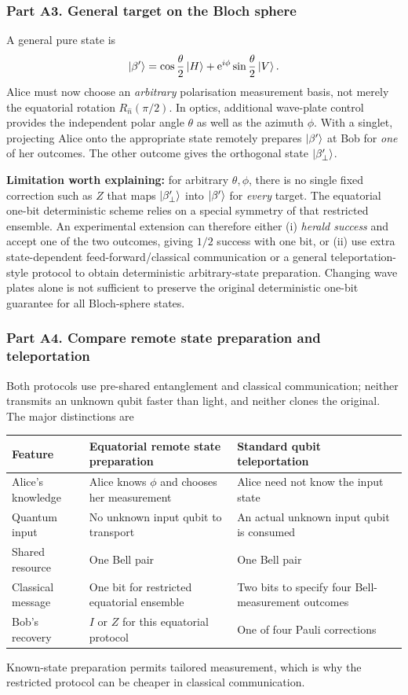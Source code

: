 \subsubsection*{Part A3. General target on the Bloch sphere}
A general pure state is
\begin{equation}\left\lvert \beta'\right\rangle=\cos\frac\theta2\left\lvert H\right\rangle+\mathrm{e}^{i\phi}\sin\frac\theta2\left\lvert V\right\rangle.\end{equation}
Alice must now choose an \emph{arbitrary} polarisation measurement basis, not merely the equatorial rotation $R_{\hat n}(\pi/2)$. In optics, additional wave-plate control provides the independent polar angle $\theta$ as well as the azimuth $\phi$. With a singlet, projecting Alice onto the appropriate state remotely prepares $\left\lvert \beta'\right\rangle$ at Bob for \emph{one} of her outcomes. The other outcome gives the orthogonal state $\left\lvert \beta'_{\perp}\right\rangle$.

\textbf{Limitation worth explaining:} for arbitrary $\theta,\phi$, there is no single fixed correction such as $Z$ that maps $\left\lvert \beta'_{\perp}\right\rangle$ into $\left\lvert \beta'\right\rangle$ for \emph{every} target. The equatorial one-bit deterministic scheme relies on a special symmetry of that restricted ensemble. An experimental extension can therefore either (i) \emph{herald success} and accept one of the two outcomes, giving $1/2$ success with one bit, or (ii) use extra state-dependent feed-forward/classical communication or a general teleportation-style protocol to obtain deterministic arbitrary-state preparation. Changing wave plates alone is not sufficient to preserve the original deterministic one-bit guarantee for all Bloch-sphere states.

\subsubsection*{Part A4. Compare remote state preparation and teleportation}
Both protocols use pre-shared entanglement and classical communication; neither transmits an unknown qubit faster than light, and neither clones the original. The major distinctions are
\begin{center}\small
\begin{tabularx}{\linewidth}{@{}p{27mm}XX@{}}\toprule Feature&Equatorial remote state preparation&Standard qubit teleportation\\\midrule
Alice's knowledge&Alice knows $\phi$ and chooses her measurement&Alice need not know the input state\\
Quantum input&No unknown input qubit to transport&An actual unknown input qubit is consumed\\
Shared resource&One Bell pair&One Bell pair\\
Classical message&One bit for restricted equatorial ensemble&Two bits to specify four Bell-measurement outcomes\\
Bob's recovery&$I$ or $Z$ for this equatorial protocol&One of four Pauli corrections\\\bottomrule
\end{tabularx}\end{center}
Known-state preparation permits tailored measurement, which is why the restricted protocol can be cheaper in classical communication.


